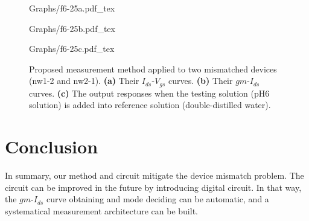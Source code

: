 \documentclass{article}
\begin{document}
\begin{figure}[!htb]

    \begin{minipage}[!htb]{0.5\linewidth}
        \centering
        \def\svgwidth{4cm}
        \fontsize{6}{8}\selectfont
         {Graphs/f6-25a.pdf_tex}
    \end{minipage}
    \hfill
    \begin{minipage}[!htb]{0.5\linewidth}
        \centering
        \def\svgwidth{5.1cm}
        \fontsize{6}{8}\selectfont
         {Graphs/f6-25b.pdf_tex}
    \end{minipage}
    \vfill
    \begin{minipage}[!hb]{1\linewidth}
        \centering
        \def\svgwidth{9cm}
        \fontsize{8}{10}\selectfont
         {Graphs/f6-25c.pdf_tex}
    \end{minipage}
    \caption{Proposed measurement method applied to two mismatched devices (nw1-2 and nw2-1).
                \textbf{(a)} Their $I_{ds}$-$V_{gs}$ curves.
                \textbf{(b)} Their $gm$-$I_{ds}$ curves.
                \textbf{(c)} The output responses when the testing solution (pH6 solution) is added into reference solution (double-distilled water).
                }
    \label{fig:dV}
\end{figure}

\section{Conclusion}
In summary, our method and circuit mitigate the device mismatch problem.
The circuit can be improved in the future by introducing digital circuit.
In that way, the $gm$-$I_{ds}$ curve obtaining and mode deciding can be automatic, and a systematical measurement architecture can be built.



\end{document}
